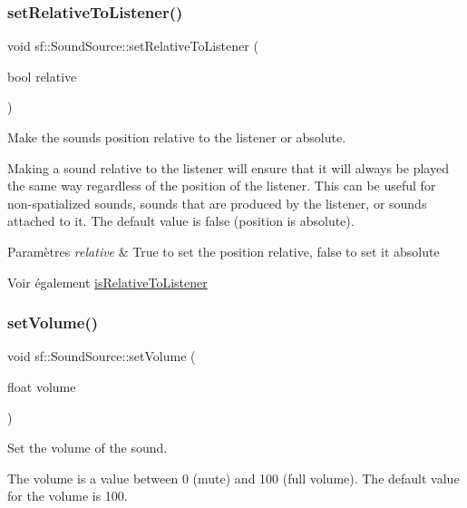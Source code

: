 \subsubsection{\texorpdfstring{set\+Relative\+To\+Listener()}{setRelativeToListener()}}
{\footnotesize\ttfamily void sf\+::\+Sound\+Source\+::set\+Relative\+To\+Listener (\begin{DoxyParamCaption}\item[{bool}]{relative }\end{DoxyParamCaption})}



Make the sound\textquotesingle{}s position relative to the listener or absolute. 

Making a sound relative to the listener will ensure that it will always be played the same way regardless of the position of the listener. This can be useful for non-\/spatialized sounds, sounds that are produced by the listener, or sounds attached to it. The default value is false (position is absolute).


\begin{DoxyParams}{Paramètres}
{\em relative} & True to set the position relative, false to set it absolute\\
\hline
\end{DoxyParams}
\begin{DoxySeeAlso}{Voir également}
\hyperlink{classsf_1_1SoundSource_adcdb4ef32c2f4481d34aff0b5c31534b}{is\+Relative\+To\+Listener} 
\end{DoxySeeAlso}
\mbox{\label{classsf_1_1SoundSource_a2f192f2b49fb8e2b82f3498d3663fcc2}} 
\subsubsection{\texorpdfstring{set\+Volume()}{setVolume()}}
{\footnotesize\ttfamily void sf\+::\+Sound\+Source\+::set\+Volume (\begin{DoxyParamCaption}\item[{float}]{volume }\end{DoxyParamCaption})}



Set the volume of the sound. 

The volume is a value between 0 (mute) and 100 (full volume). The default value for the volume is 100.


